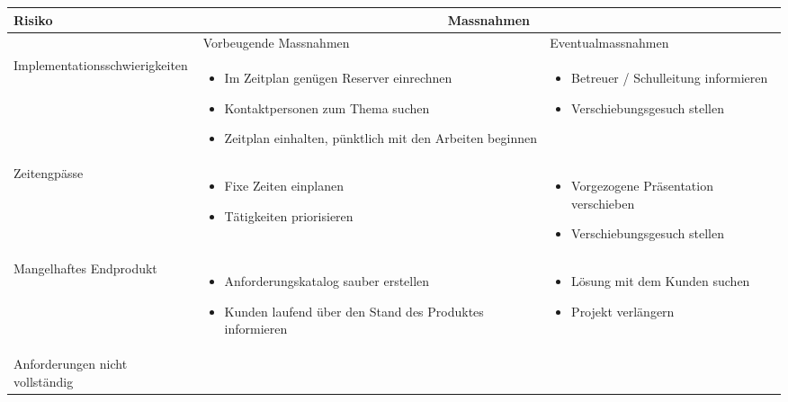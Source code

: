 \begin{table}[ht]
\centering
  \begin{tabular}{  l | p{4.5cm} | p{4.5cm} }
	\hline
	\rowcolor{darkgray}
	\textbf{Risiko}					&	\multicolumn{2}{|c|}{\textbf{Massnahmen}} \\ \hline
	\rowcolor{gray}
								&	Vorbeugende Massnahmen & Eventualmassnahmen	\\ \hline
	Implementationsschwierigkeiten
								&	\begin{itemize}
										\item Im Zeitplan genügen Reserver einrechnen
										\item Kontaktpersonen zum Thema suchen
										\item Zeitplan einhalten, pünktlich mit den Arbeiten beginnen
									\end{itemize}
								&	\begin{itemize}
										\item Betreuer / Schulleitung informieren
										\item Verschiebungsgesuch stellen
									\end{itemize}						\\ \hline
	Zeitengpässe
								&	\begin{itemize}
										\item Fixe Zeiten einplanen
										\item Tätigkeiten priorisieren
									\end{itemize}
								&	\begin{itemize}
										\item Vorgezogene Präsentation verschieben
										\item Verschiebungsgesuch stellen
									\end{itemize}	\\ \hline
	Mangelhaftes Endprodukt		
								&	\begin{itemize}
										\item Anforderungskatalog sauber erstellen
										\item Kunden laufend über den Stand des Produktes informieren
									\end{itemize}
								&	\begin{itemize}
										\item Lösung mit dem Kunden suchen
										\item Projekt verlängern
									\end{itemize}	\\ \hline	
	Anforderungen nicht vollständig	

\end{tabular}
\end{table}
